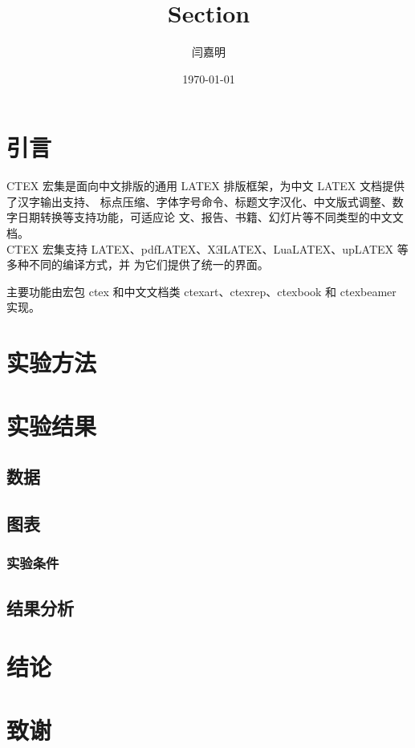 \documentclass[UTF8]{ctexart}
\title{Section}
\author{\kaishu 闫嘉明} %
\date{\heiti \today}
\begin{document}
    \maketitle
    \section{引言}
    CTEX 宏集是面向中文排版的通用 LATEX 排版框架，为中文 LATEX 文档提供了汉字输出支持、
标点压缩、字体字号命令、标题文字汉化、中文版式调整、数字日期转换等支持功能，可适应论
文、报告、书籍、幻灯片等不同类型的中文文档。\\CTEX 宏集支持 LATEX、pdfLATEX、XƎLATEX、LuaLATEX、upLATEX 等多种不同的编译方式，并
为它们提供了统一的界面。 \par 主要功能由宏包 ctex 和中文文档类 ctexart、ctexrep、ctexbook 和
ctexbeamer 实现。
    \section{实验方法}
    \section{实验结果}
    \subsection{数据}
    \subsection{图表}
    \subsubsection{实验条件}
    \subsection{结果分析}
    \section{结论}
    \section{致谢}
\end{document}
